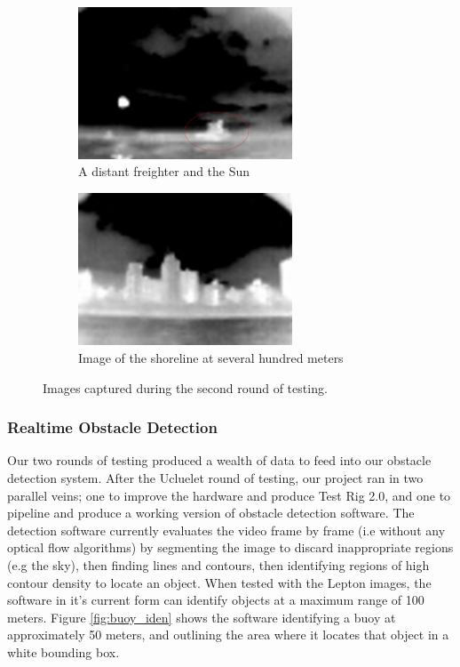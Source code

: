 \begin{figure}[h]
\centering
\begin{subfigure}{0.45\textwidth}
 \centering
 \includegraphics[width=0.7\textwidth]{"./image/FreighterSun_circled"}
 \caption{A distant freighter and the Sun}
 \label{fig:testround2:sub1}
\end{subfigure}
\begin{subfigure}{0.45\textwidth}
 \centering
 \includegraphics[width=0.7\textwidth]{"./image/Land"}
 \caption{Image of the shoreline at several hundred meters}
 \label{fig:testround2:sub2}
\end{subfigure}
\caption{Images captured during the second round of testing.}
\label{fig:testround2}
\end{figure}


\subsubsection{\label{sec:discussion:results:realtimeDetection}Realtime Obstacle Detection}

Our two rounds of testing produced a wealth of data to feed into our obstacle detection system. After the Ucluelet round of testing, our project ran in two parallel veins; one to improve the hardware and produce Test Rig 2.0, and one to pipeline and produce a working version of obstacle detection software. The detection software currently evaluates the video frame by frame (i.e without any optical flow algorithms) by segmenting the image to discard inappropriate regions (e.g the sky), then finding lines and contours, then identifying regions of high contour density to locate an object. When tested with the Lepton images, the software in it's current form can identify objects at a maximum range of 100 meters.  Figure \ref{fig:buoy_iden} shows the software identifying a buoy at approximately 50 meters, and outlining the area where it locates that object in a white bounding box.


